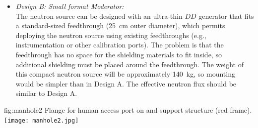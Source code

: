 \begin{itemize}
\item {\it Design B: Small format Moderator:}\\
The neutron source can be designed with an ultra-thin $DD$ generator that fits a standard-sized feedthrough (\SI{25}{\cm} outer diameter), which permits deploying the neutron source using existing feedthroughs (e.g., instrumentation or other calibration ports). The problem is that the feedthrough has no space for the shielding materials to fit inside, so additional shielding must be placed around the feedthrough. The weight of this compact neutron source will be approximately \SI{140}{\kg}, so mounting would be simpler than in Design A. The effective neutron flux should be similar to Design A. 
\end{itemize}

\begin{dunefigure}{fig:manhole2}
{Flange for human access port on  and support structure (red frame).}
\texttt{[image: manhole2.jpg]}
\end{dunefigure}

